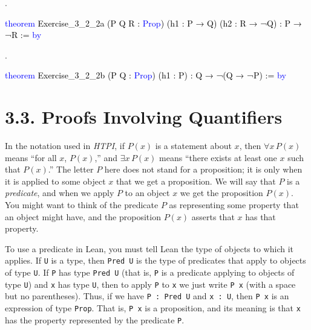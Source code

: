 \documentclass[
  letterpaper,
  DIV=11,
  numbers=noendperiod]{scrreprt}
\makeatletter
\newenvironment{Shaded}{\begin{snugshade}}{\end{snugshade}}
\newcommand{\KeywordTok}[1]{\textcolor[rgb]{0.00,0.23,0.31}{#1}}
\newcommand{\NormalTok}[1]{\textcolor[rgb]{0.00,0.23,0.31}{#1}}
\newcommand{\SpecialCharTok}[1]{\textcolor[rgb]{0.37,0.37,0.37}{#1}}
\newcommand{\WarningTok}[1]{\textcolor[rgb]{0.37,0.37,0.37}{\textit{#1}}}
\def\redsquiggly{\bgroup \markoverwith{\textcolor{red}{\lower3.5\p@\hbox{\sixly \char58}}}\ULon}
\renewcommand{\NormalTok}[1]{\textcolor[HTML]{000000}{#1}}
\renewcommand{\KeywordTok}[1]{\textcolor[HTML]{0000FF}{#1}}
\renewcommand{\SpecialCharTok}[1]{}
\renewcommand{\WarningTok}[1]{\redsquiggly{\textcolor[HTML]{0000FF}{#1}}}
\newcommand{\nobreakShaded}{\renewenvironment{Shaded}
	{\begin{tcolorbox}[frame hidden, enhanced, interior hidden, boxrule=0pt,
		borderline west={3pt}{0pt}{shadecolor}, sharp corners]}
	{\end{tcolorbox}}}
\newenvironment{numex}[1]
	{\begin{minipage}[t]{0.04\textwidth}\vspace{8pt}{#1}.
		\end{minipage}\nobreakShaded\begin{minipage}[t]{0.96\textwidth}\vspace{0pt}}
	{\end{minipage}}
\theoremstyle{remark}
\makeatother
\begin{document}
\begin{numex}{3}

\begin{Shaded}
\begin{Highlighting}[]
\KeywordTok{theorem}\NormalTok{ Exercise\_3\_2\_2a (P Q R : }\KeywordTok{Prop}\NormalTok{)}
\NormalTok{    (h1 : P → Q) (h2 : R → ¬Q) : P → ¬R := }\KeywordTok{by}
  
  \SpecialCharTok{**}\WarningTok{done}\SpecialCharTok{::}
\end{Highlighting}
\end{Shaded}

\end{numex}

\begin{numex}{4}

\begin{Shaded}
\begin{Highlighting}[]
\KeywordTok{theorem}\NormalTok{ Exercise\_3\_2\_2b (P Q : }\KeywordTok{Prop}\NormalTok{)}
\NormalTok{    (h1 : P) : Q → ¬(Q → ¬P) := }\KeywordTok{by}
  
  \SpecialCharTok{**}\WarningTok{done}\SpecialCharTok{::}
\end{Highlighting}
\end{Shaded}

\end{numex}

\hypertarget{proofs-involving-quantifiers}{%
\section{3.3. Proofs Involving
Quantifiers}\label{proofs-involving-quantifiers}}

In the notation used in \emph{HTPI}, if \(P(x)\) is a statement about
\(x\), then \(\forall x\, P(x)\) means ``for all \(x\), \(P(x)\),'' and
\(\exists x\, P(x)\) means ``there exists at least one \(x\) such that
\(P(x)\).'' The letter \(P\) here does not stand for a proposition; it
is only when it is applied to some object \(x\) that we get a
proposition. We will say that \(P\) is a \emph{predicate}, and when we
apply \(P\) to an object \(x\) we get the proposition \(P(x)\). You
might want to think of the predicate \(P\) as representing some property
that an object might have, and the proposition \(P(x)\) asserts that
\(x\) has that property.

To use a predicate in Lean, you must tell Lean the type of objects to
which it applies. If \texttt{U} is a type, then \texttt{Pred\ U} is the
type of predicates that apply to objects of type \texttt{U}. If
\texttt{P} has type \texttt{Pred\ U} (that is, \texttt{P} is a predicate
applying to objects of type \texttt{U}) and \texttt{x} has type
\texttt{U}, then to apply \texttt{P} to \texttt{x} we just write
\texttt{P\ x} (with a space but no parentheses). Thus, if we have
\texttt{P\ :\ Pred\ U} and \texttt{x\ :\ U}, then \texttt{P\ x} is an
expression of type \texttt{Prop}. That is, \texttt{P\ x} is a
proposition, and its meaning is that \texttt{x} has the property
represented by the predicate \texttt{P}.
\end{document}
